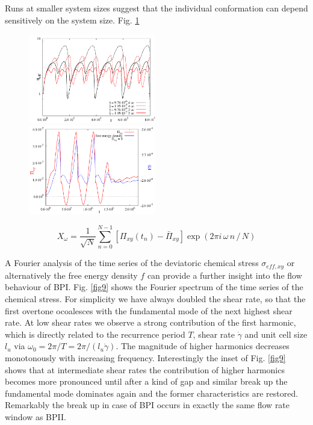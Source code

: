 \documentclass[aps,pre,reprint,superscriptaddress]{revtex4}
\begin{document}
Runs at smaller system sizes suggest that the individual conformation 
can depend sensitively on the system size. Fig. \ref{bp1-2uc4uc} 


\begin{figure}[h]
\includegraphics[width=0.495\textwidth]{stress_bp1_2uc_4uc.pdf}
\includegraphics[width=0.495\textwidth]{stress_fe_yield_bp1.pdf}
\caption{}
\label{bp1-2uc4uc}
\end{figure}



\begin{equation}
X_\omega=\frac{1}{\sqrt{N}}\sum_{n=0}^{N-1} \left[\Pi_{xy}(t_n) - \bar{\Pi}_{xy}\right] \exp(2\pi i \, \omega \,n\,/\,N)
\end{equation}

A Fourier analysis of the time series of the deviatoric chemical stress $\sigma_{eff,xy}$ or alternatively the free energy density $f$ can provide a further insight into the flow behaviour of BPI.
Fig. \ref{fig9} shows the Fourier spectrum of the time series of the chemical stress.
For simplicity we have always doubled the shear rate, so that the first overtone ocoalesces with the fundamental mode of the next highest shear rate. 
At low shear rates we observe a strong contribution of the first harmonic, which is directly related to the recurrence period $T$, shear rate $\dot{\gamma}$ and unit cell size $l_{u}$ via $\omega_0=2\pi/T=2\pi/(l_{u}\dot{\gamma})$.
The magnitude of higher harmonics decreases monotonously with increasing frequency.
Interestingly the inset of Fig. \ref{fig9} shows that at intermediate shear rates the contribution of higher harmonics becomes more pronounced until after a kind of gap and similar break up the fundamental mode dominates again and the former characteristics are restored.
Remarkably the break up in case of BPI occurs in exactly the same flow rate window as BPII.
\end{document}
